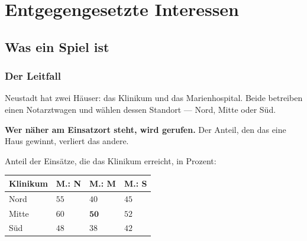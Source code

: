 \part{Entgegengesetzte Interessen}

\chapter{Was ein Spiel ist}

\section{Der Leitfall}

\begin{merksatz}
Neustadt hat zwei Häuser: das Klinikum und das Marienhospital. Beide betreiben einen Notarztwagen und wählen dessen Standort --- Nord, Mitte oder Süd.

\begin{center}
\begin{minipage}{0.9\textwidth}
\textbf{Wer näher am Einsatzort steht, wird gerufen.} Der Anteil, den das eine Haus gewinnt, verliert das andere.
\end{minipage}
\end{center}

Anteil der Einsätze, die das Klinikum erreicht, in Prozent:

\begin{center}
{\small
\renewcommand{\arraystretch}{1.55}
\begin{tabular}{@{}P{2.2cm}P{1.6cm}P{1.6cm}P{1.6cm}@{}}
\toprule
\textbf{Klinikum} & \textbf{M.: N} & \textbf{M.: M} & \textbf{M.: S}\\
\midrule
Nord & $55$ & $40$ & $45$\\
Mitte & $60$ & $\mathbf{50}$ & $52$\\
Süd & $48$ & $38$ & $42$\\
\bottomrule
\end{tabular}}
\end{center}

\begin{center}
\begin{minipage}{0.88\textwidth}
\end{minipage}
\end{center}
\end{merksatz}

